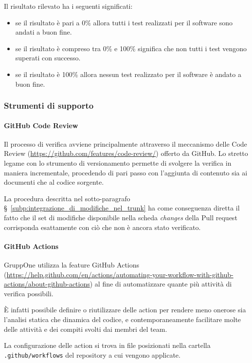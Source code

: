 \documentclass[../../norme-di-progetto.tex]{subfiles}
\begin{document}
Il risultato rilevato ha i seguenti significati:
\begin{itemize}
  \item se il risultato è pari a 0\% allora tutti i test realizzati per il software sono andati a buon fine.
  \item se il risultato è compreso tra 0\% e 100\% significa che non tutti i test vengono superati con successo.
  \item se il risultato è 100\% allora nessun test realizzato per il software è andato a buon fine.
\end{itemize}




\subsubsection{Strumenti di supporto}%
\label{subs:verifica/strumenti}

\paragraph{GitHub Code Review}%
\label{par:code_review}

Il processo di verifica avviene principalmente attraverso il meccanismo delle Code Review (\href{https://github.com/features/code-review/}{https://github.com/features/code-review/}) offerto da GitHub.
Lo stretto legame con lo strumento di versionamento permette di svolgere la verifica in maniera incrementale, procedendo di pari passo con l'aggiunta di contenuto sia ai documenti che al codice sorgente.

La procedura descritta nel sotto-paragrafo §~\ref{subp:integrazione_di_modifiche_nel_trunk} ha come conseguenza diretta il fatto che il set di modifiche disponibile nella scheda \textit{changes} della Pull request corrisponda esattamente con ciò che non è ancora stato verificato.


\paragraph{GitHub Actions}%
\label{par:github_actions}

GruppOne utilizza la feature GitHub Actions (\href{https://help.github.com/en/actions/automating-your-workflow-with-github-actions/about-github-actions}{https://help.github.com/en/actions/automating-your-workflow-with-github-actions/about-github-actions}) al fine di automatizzare quante più attività di verifica possibili.

È infatti possibile definire o riutilizzare delle action per rendere meno onerose sia l'analisi statica che dinamica del codice, e contemporaneamente facilitare molte delle attività e dei compiti svolti dai membri del team.

La configurazione delle action si trova in file  posizionati nella cartella \verb|.github/workflows| del repository a cui vengono applicate.


\end{document}
